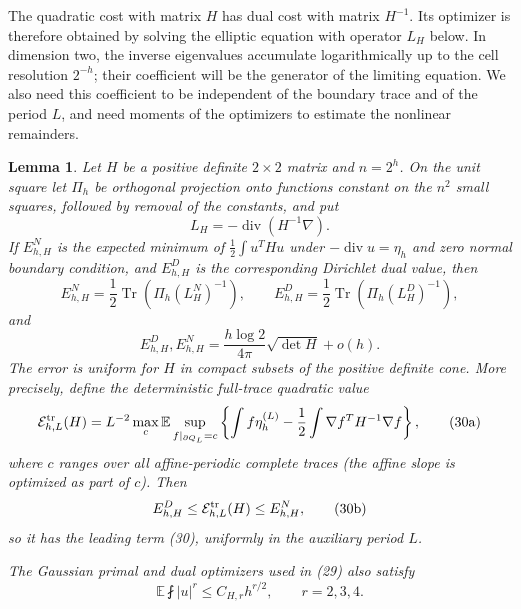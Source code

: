 \documentclass{aomart}
\newtheorem{lemma}[theorem]{Lemma}
\theoremstyle{definition}
\newcommand{\1}{\mathbf 1}
\begin{document}
The quadratic cost with matrix $H$ has dual cost with matrix $H^{-1}$.
Its optimizer is therefore obtained by solving the elliptic equation
with operator $L_H$ below.  In dimension two, the inverse eigenvalues
accumulate logarithmically up to the cell resolution $2^{-h}$; their
coefficient will be the generator of the limiting equation.  We also
need this coefficient to be independent of the boundary trace and of
the period $L$, and need moments of the optimizers to estimate the
nonlinear remainders.

\begin{lemma}\label{lem:grouped-quadratic-generator}
Let $H$ be a positive definite $2\times2$ matrix and
$n=2^h$.  On the unit square let $\Pi_ h$ be orthogonal projection
onto functions constant on the $n^2$ small squares, followed by
removal of the constants, and put
\begin{equation*}
L_ H=-\operatorname {div}(H^{-1}\nabla).
\end{equation*}
If $E_ {h,H}^N$ is the expected minimum of
$\frac12\int u^THu$ under
$-\operatorname {div}u=\eta_ h$ and zero normal boundary condition,
and $E_ {h,H}^D$ is the corresponding Dirichlet dual value, then
\begin{equation}
E_ {h,H}^N=\frac12\operatorname {Tr}(\Pi_ h(L_ H^N)^{-1}),
\qquad
E_ {h,H}^D=\frac12\operatorname {Tr}(\Pi_ h(L_ H^D)^{-1}),
\tag{29}
\end{equation}
and
\begin{equation}
E_ {h,H}^D,E_ {h,H}^N
=\frac{h\log2}{4\pi}\sqrt{\det H}+o(h).
\tag{30}
\end{equation}
The error is uniform for $H$ in compact subsets of the positive
definite cone.  More precisely, define the deterministic full-trace
quadratic value
\begin{equation}
\mathcal E^{\rm tr}_ {h,L}(H)=L^{-2}\max_ c\mathbb E
\sup_ {f|_ {\partial Q_ L}=c}
\left\{\int f\eta_ h^{(L)}
-\frac12\int\nabla f^TH^{-1}\nabla f\right\},
\tag{30a}
\end{equation}
where $c$ ranges over all affine-periodic complete traces (the affine
slope is optimized as part of $c$).  Then
\begin{equation}
E_ {h,H}^D\leq\mathcal E^{\rm tr}_ {h,L}(H)\leq E_ {h,H}^N,
\tag{30b}
\end{equation}
so it has the leading term (30), uniformly in the auxiliary period
$L$.

The Gaussian primal and dual optimizers used in (29) also satisfy
\begin{equation}
\mathbb E\fint |u|^r\leq C_ {H,r}h^{r/2},\qquad r=2,3,4.
\tag{31}
\end{equation}

\end{lemma}
\end{document}
